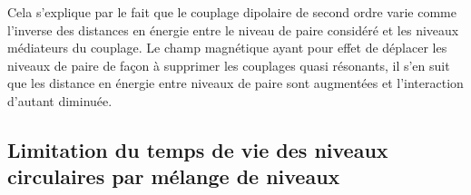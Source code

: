 Cela s'explique par le fait que le couplage dipolaire de second ordre varie comme l'inverse des distances en énergie entre le niveau de paire considéré et les niveaux médiateurs du couplage.
Le champ magnétique ayant pour effet de déplacer les niveaux de paire de façon à supprimer les couplages quasi résonants, il s'en suit que les distance en énergie entre niveaux de paire sont augmentées et l'interaction d'autant diminuée.
%

\subsection{Limitation du temps de vie des niveaux circulaires par mélange de niveaux}

